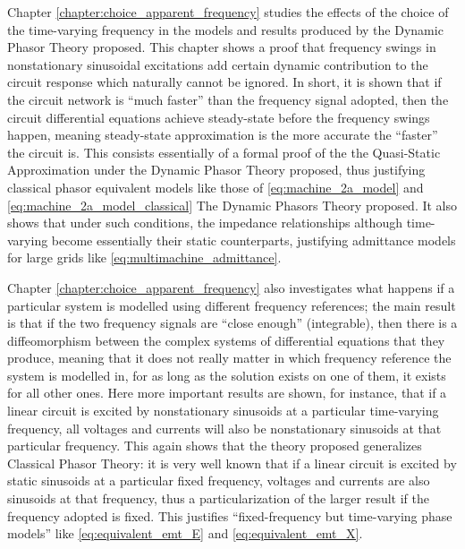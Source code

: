 	Chapter \ref{chapter:choice_apparent_frequency} studies the effects of the choice of the time-varying frequency in the models and results produced by the Dynamic Phasor Theory proposed. This chapter shows a proof that frequency swings in nonstationary sinusoidal excitations add certain dynamic contribution to the circuit response which naturally cannot be ignored. In short, it is shown that if the circuit network is ``much faster'' than the frequency signal adopted, then the circuit differential equations achieve steady-state before the frequency swings happen, meaning steady-state approximation is the more accurate the ``faster'' the circuit is. This consists essentially of a formal proof of the the Quasi-Static Approximation under the Dynamic Phasor Theory proposed, thus justifying classical phasor equivalent models like those of \eqref{eq:machine_2a_model} and \eqref{eq:machine_2a_model_classical} The Dynamic Phasors Theory proposed. It also shows that under such conditions, the impedance relationships although time-varying become essentially their static counterparts, justifying admittance models for large grids like \eqref{eq:multimachine_admittance}.

	Chapter \ref{chapter:choice_apparent_frequency} also investigates what happens if a particular system is modelled using different frequency references; the main result is that if the two frequency signals are ``close enough'' (integrable), then there is a diffeomorphism between the complex systems of differential equations that they produce, meaning that it does not really matter in which frequency reference the system is modelled in, for as long as the solution exists on one of them, it exists for all other ones. Here more important results are shown, for instance, that if a linear circuit is excited by nonstationary sinusoids at a particular time-varying frequency, all voltages and currents will also be nonstationary sinusoids at that particular frequency. This again shows that the theory proposed generalizes Classical Phasor Theory: it is very well known that if a linear circuit is excited by static sinusoids at a particular fixed frequency, voltages and currents are also sinusoids at that frequency, thus a particularization of the larger result if the frequency adopted is fixed. This justifies ``fixed-frequency but time-varying phase models'' like \eqref{eq:equivalent_emt_E} and \eqref{eq:equivalent_emt_X}.

